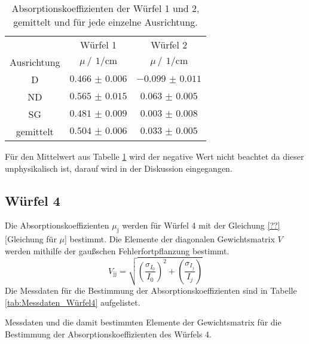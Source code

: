 \begin{table}
    \centering
    \caption{Absorptionskoeffizienten der Würfel 1 und 2, gemittelt und für jede einzelne Ausrichtung.}
    \label{tab:Absorptionskoeffizienten_1_2}
    \begin{tabular}{c c c}
        \toprule
        &Würfel 1&Würfel 2\\
        \cmidrule(lr){2-2}\cmidrule(lr){3-3}
        Ausrichtung&$\mu \,/\,\SI{}{1\per\centi\meter}$&$\mu \,/\,\SI{}{1\per\centi\meter}$\\
        \midrule
        D &$\num{0.466(6)}$&$\num{-0.099(11)}$\\
        ND&$\num{0.565(15)}$&$\num{0.063(5)}$\\
        SG&$\num{0.481(9)}$&$\num{0.003(8)}$\\
        \midrule
        gemittelt&$\num{0.504(6)}$&$\num{0.033(5)}$\\
        \bottomrule
    \end{tabular}
\end{table}
\FloatBarrier
Für den Mittelwert aus Tabelle \ref{tab:Absorptionskoeffizienten_1_2} wird der negative Wert nicht beachtet da dieser unphysikalisch ist,
darauf wird in der Diskussion eingegangen.
\subsection{Würfel 4}
Die Absorptionskoeffizienten $\mu_{\text{j}}$ werden für Würfel 4 mit der Gleichung \eqref{??}[Gleichung für $\mu$] bestimmt.
Die Elemente der diagonalen Gewichtsmatrix $V$ werden mithilfe der gaußschen Fehlerfortpflanzung bestimmt.
\begin{equation*}
    V_{\text{jj}}= \sqrt{\left(\frac{\sigma_{I_0}}{I_0}\right)^2+ \left(\frac{\sigma_{I_j}}{I_j}\right)}
\end{equation*}
Die Messdaten für die Bestimmung der Absorptionskoeffizienten sind in Tabelle \ref{tab:Messdaten_Würfel4} aufgelistet.
\FLoatBarrier
\begin{table}
    \centering
    \caption{Messdaten und die damit bestimmten Elemente der Gewichtsmatrix für die Bestimmung der Absorptionskoeffizienten des Würfels 4.}
\end{table}